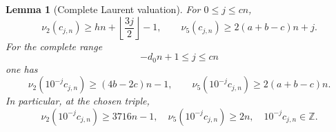 \documentclass[11pt,reqno,letterpaper]{amsart}
\numberwithin{equation}{section}
\newtheorem{lemma}[theorem]{Lemma}
\theoremstyle{definition}
\theoremstyle{remark}
\begin{document}
\begin{lemma}[Complete Laurent valuation]\label{lem:laurent-valuations}
For $0\leq j\leq cn$,
\begin{equation}\label{eq:positive-laurent-valuations}
 \nu_2(c_{j,n})\geq hn+\left\lfloor\frac{3j}{2}\right\rfloor-1,
 \qquad
 \nu_5(c_{j,n})\geq2(a+b-c)n+j.
\end{equation}
For the complete range
\begin{equation}\label{eq:needed-laurent-range}
 -d_0n+1\leq j\leq cn
\end{equation}
one has
\begin{equation}\label{eq:scaled-laurent-valuations}
 \nu_2(10^{-j}c_{j,n})\geq(4b-2c)n-1,
 \qquad
 \nu_5(10^{-j}c_{j,n})\geq2(a+b-c)n.
\end{equation}
In particular, at the chosen triple,
\begin{equation}\label{eq:scaled-laurent-integrality}
 \nu_2(10^{-j}c_{j,n})\geq3716n-1,
 \quad \nu_5(10^{-j}c_{j,n})\geq2n,
 \quad 10^{-j}c_{j,n}\in\mathbb Z.
\end{equation}
\end{lemma}
\end{document}
